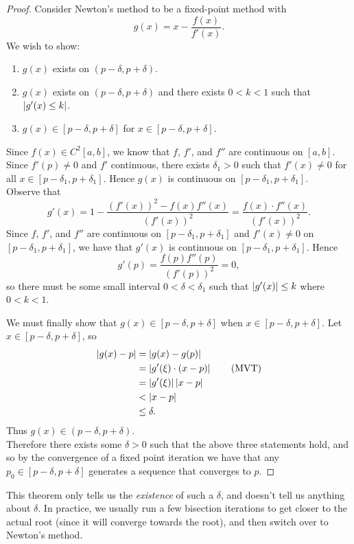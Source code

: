 \documentclass[class=article, crop=false]{standalone}
\begin{document}
  \begin{proof}
    Consider Newton's method to be a fixed-point method with
    \[
      g(x) = x - \frac{f(x)}{f'(x)}.
    \]
    We wish to show:
    \begin{enumerate}[label=(\roman*)]
      \item $g(x)$ exists on $(p - \delta, p + \delta)$.
      \item $g(x)$ exists on $(p - \delta, p + \delta)$ and there exists $0 < k < 1$ such that $\left\lvert g'(x) \leq k \right\rvert$.
      \item $g(x)\in [p - \delta, p + \delta]$ for $x\in [p - \delta, p + \delta]$.
    \end{enumerate}
    Since $f(x)\in C^2[a, b]$, we know that $f$, $f'$, and $f''$ are continuous on $[a, b]$. Since $f'(p)\neq 0$ and $f'$ continuous, there exists $\delta_1 > 0$ such that $f'(x)\neq 0$ for all $x\in [p - \delta_1, p + \delta_1]$. Hence $g(x)$ is continuous on $[p - \delta_1, p + \delta_1]$. \\
    Observe that
    \[
      g'(x) = 1 - \frac{(f'(x))^2 - f(x)f''(x)}{(f'(x))^2} = \frac{f(x)\cdot f''(x)}{(f'(x))^2}.
    \]
    Since $f$, $f'$, and $f''$ are continuous on $[p - \delta_1, p + \delta_1]$ and $f'(x)\neq 0$ on $[p - \delta_1, p + \delta_1]$, we have that $g'(x)$ is continuous on $[p - \delta_1, p + \delta_1]$. Hence
    \[
      g'(p) = \frac{f(p)f''(p)}{(f'(p))^2} = 0,
    \]
    so there must be some small interval $0 < \delta < \delta_1$ such that $\left\lvert g'(x) \right\rvert \leq k$ where $0 < k < 1$. \par
    We must finally show that $g(x)\in [p - \delta, p + \delta]$ when $x\in [p - \delta, p + \delta]$. Let $x\in [p - \delta, p + \delta]$, so
    \begin{align*}
      \left\lvert g(x) - p \right\rvert &= \left\lvert g(x) - g(p) \right\rvert \\
                     &= \left\lvert g'(\xi)\cdot (x - p) \right\rvert \tag{MVT} \\
                     &= \left\lvert g'(\xi) \right\rvert \left\lvert x - p \right\rvert \\
                     &< \left\lvert x - p \right\rvert \\
                     &\leq \delta.
    \end{align*}
    Thus $g(x)\in (p - \delta, p + \delta)$. \\
    Therefore there exists some $\delta > 0$ such that the above three statements hold, and so by the convergence of a fixed point iteration we have that any $p_0\in [p - \delta, p + \delta]$ generates a sequence that converges to $p$.
  \end{proof}
  \begin{note}{}
    This theorem only tells us the \emph{existence} of such a $\delta$, and doesn't tell us anything about $\delta$. In practice, we usually run a few bisection iterations to get closer to the actual root (since it will converge towards the root), and then switch over to Newton's method.
  \end{note}
\end{document}
